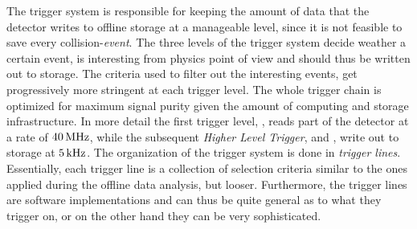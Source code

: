 The trigger system is responsible for keeping the amount of data that the detector writes to offline storage
at a manageable level, since it is not feasible to save every collision-{\it event}. The three levels of
the \lhcb trigger system decide weather a certain event, is interesting from physics point
of view and should thus be written out to storage. The criteria used to filter out the interesting events, get
progressively more stringent at each trigger level. The whole trigger chain is optimized for maximum
signal purity given the amount of computing and storage infrastructure. In more detail the first trigger
level, \lzero, reads part of the detector at a rate of $40{\rm \,MHz}$, while the subsequent {\it Higher Level Trigger},
\hltone and \hlttwo, write out to storage at $5{\rm \,kHz}$. The organization of the trigger system is done in
{\it trigger lines}. Essentially, each trigger line is a collection of selection criteria similar to the
ones applied during the offline data analysis, but looser. Furthermore, the trigger lines are software
implementations and can thus be quite general as to what they trigger on, or on the other hand they can
be very sophisticated.

